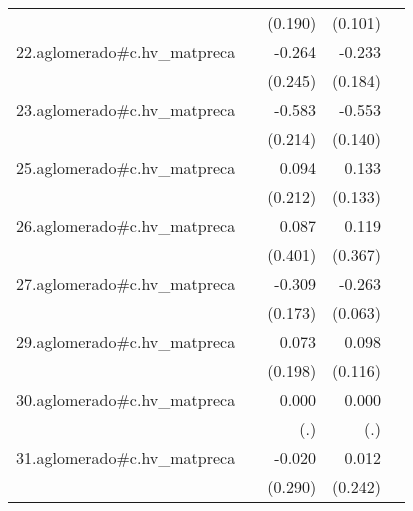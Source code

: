 {\begin{longtable}{l*{4}{D{.}{.}{-1}}}
            &                     &     (0.190)         &     (0.101)         &                     \\
\addlinespace
22.aglomerado#c.hv\_matpreca&                     &      -0.264         &      -0.233         &                     \\
            &                     &     (0.245)         &     (0.184)         &                     \\
\addlinespace
23.aglomerado#c.hv\_matpreca&                     &      -0.583\sym{**} &      -0.553\sym{***}&                     \\
            &                     &     (0.214)         &     (0.140)         &                     \\
\addlinespace
25.aglomerado#c.hv\_matpreca&                     &       0.094         &       0.133         &                     \\
            &                     &     (0.212)         &     (0.133)         &                     \\
\addlinespace
26.aglomerado#c.hv\_matpreca&                     &       0.087         &       0.119         &                     \\
            &                     &     (0.401)         &     (0.367)         &                     \\
\addlinespace
27.aglomerado#c.hv\_matpreca&                     &      -0.309         &      -0.263\sym{***}&                     \\
            &                     &     (0.173)         &     (0.063)         &                     \\
\addlinespace
29.aglomerado#c.hv\_matpreca&                     &       0.073         &       0.098         &                     \\
            &                     &     (0.198)         &     (0.116)         &                     \\
\addlinespace
30.aglomerado#c.hv\_matpreca&                     &       0.000         &       0.000         &                     \\
            &                     &         (.)         &         (.)         &                     \\
\addlinespace
31.aglomerado#c.hv\_matpreca&                     &      -0.020         &       0.012         &                     \\
            &                     &     (0.290)         &     (0.242)         &                     \\

\end{longtable}}
